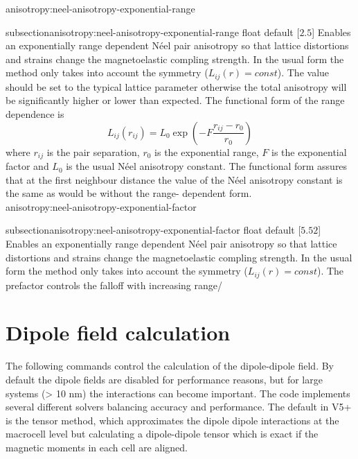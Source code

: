 {\zicf anisotropy:neel-anisotropy-exponential-range}
{subsection}{anisotropy:neel-anisotropy-exponential-range}
  float default [$2.5$]
  Enables an exponentially range dependent N\'eel pair anisotropy so that
  lattice distortions and strains change the magnetoelastic compling strength.
  In the usual form the method only takes into account the symmetry ($L_{ij}(r)
  = const$). The value should be set to the typical lattice parameter otherwise
  the total anisotropy will be significantly higher or lower than expected. The
  functional form of the range dependence is
  \begin{equation}
     L_{ij}(r_{ij}) = L_0 \exp\left(-F\frac{r_{ij} - r_0}{r_{0}}\right)
  \end{equation}
  where $r_{ij}$ is the pair separation, $r_0$ is the exponential range,
  $F$ is the exponential factor and $L_0$ is the usual N\'eel anisotropy constant.
  The functional form assures that at the first neighbour distance the value of
  the N\'eel anisotropy constant is the same as would be without the range-
  dependent form.\\

{\zicf anisotropy:neel-anisotropy-exponential-factor}
{subsection}{anisotropy:neel-anisotropy-exponential-factor}
   float default [$5.52$]
   Enables an exponentially range dependent N\'eel pair anisotropy so that
   lattice distortions and strains change the magnetoelastic compling strength.
   In the usual form the method only takes into account the symmetry ($L_{ij}(r)
   = const$). The prefactor controls the falloff with increasing range/\\

\section*{Dipole field calculation}
The following commands control the calculation of the dipole-dipole field. By
default the dipole fields are disabled for performance reasons, but for large
systems (> 10 nm) the interactions can become important. The \vampire code
implements several different solvers balancing accuracy and performance. The
default in V5+ is the tensor method, which approximates the dipole dipole
interactions at the macrocell level but calculating a dipole-dipole tensor which
is exact if the magnetic moments in each cell are aligned.\\

